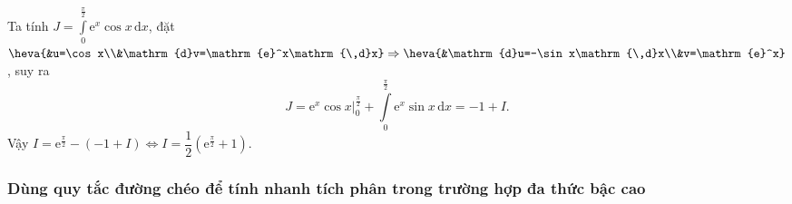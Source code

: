 \begin{ex}
{\begin{enumerate}
		Ta tính $\displaystyle J=\int\limits_0^{\frac{\pi}{2}}\mathrm{e}^x\cos x\mathrm{\,d}x$, đặt $\heva{&u=\cos x\\&\mathrm{d}v=\mathrm{e}^x\mathrm{\,d}x}\Rightarrow\heva{&\mathrm{d}u=-\sin x\mathrm{\,d}x\\&v=\mathrm{e}^x}$, suy ra
		\[J=\left.\mathrm{e}^x\cos x\right|_0^{\frac{\pi}{2}}+\int\limits_{0}^{\frac{\pi}{2}}\mathrm{e}^x\sin x\mathrm{\,d}x=-1+I.\]
		Vậy $I=\mathrm{e}^{\frac{\pi}{2}}-(-1+I)\Leftrightarrow I=\dfrac{1}{2}\left(\mathrm{e}^{\frac{\pi}{2}}+1\right)$.
	\end{enumerate}
	}
\end{ex}
\subsubsection{Dùng quy tắc đường chéo để tính nhanh tích phân trong trường hợp đa thức bậc cao}
